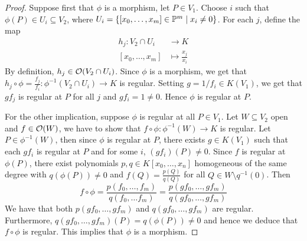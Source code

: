 \begin{proof}
	Suppose first that $\phi$ is a morphism, let $P \in V_1$.
	Choose $i$ such that $\phi(P) \in U_i \subseteq V_2$, 
	where $U_i = \{[x_0, \dots, x_m] \in \mathbb{P}^m \mid x_i \neq 0\}$.
	For each $j$, define the map
	\begin{align*}
		h_j: V_2\cap U_i &\to K\\
		[x_0, \dots, x_m] &\mapsto \frac{x_j}{x_i}
	\end{align*}
	By definition, $h_j \in \mathcal{O}(V_2\cap U_i)$.
	Since $\phi$ is a morphism, we get that
	$h_j \circ \phi = \frac{f_j}{f_i}: \phi^{-1}(V_2\cap U_i) \to K$ is regular.
	Setting $g = 1/f_i \in K(V_1)$, we get that
	$gf_j$ is regular at $P$ for all $j$ and $gf_i = 1 \neq 0$.
	Hence $\phi$ is regular at $P$.

	For the other implication, suppose $\phi$ is regular at all $P \in V_1$.
	Let $W \subseteq V_2$ open and $f \in \mathcal{O}(W)$, we have to show that
	$f\circ\phi: \phi^{-1}(W) \to K$ is regular.
	Let $P \in \phi^{-1}(W)$, then since $\phi$ is regular at $P$,
	there exists $g \in K(V_1)$ such that each $gf_i$ is regular at $P$
	and for some $i$, $(gf_i)(P) \neq 0$.
	Since $f$ is regular at $\phi(P)$, there exist polynomials
	$p, q \in K[x_0, \dots, x_n]$ homogeneous of the same degree
	with $q(\phi(P)) \neq 0$ and 
	$f(Q) = \frac{p(Q)}{q(Q)}$ for all $Q \in W\setminus q^{-1}(0)$. Then
	\begin{equation*}
		f \circ \phi = \frac{p(f_0, \dots, f_m)}{q(f_0, \dots f_m)}
		= \frac{p(gf_0, \dots, gf_m)}{q(gf_0, \dots, gf_m)}
	\end{equation*}
	We have that both $p(gf_0, \dots, gf_m)$ and $q(gf_0, \dots, gf_m)$ are
	regular. Furthermore, $q(gf_0, \dots, gf_m)(P) = q(\phi(P)) \neq 0$
	and hence we deduce that $f\circ \phi$ is regular.
	This implies that $\phi$ is a morphism.
\end{proof}
